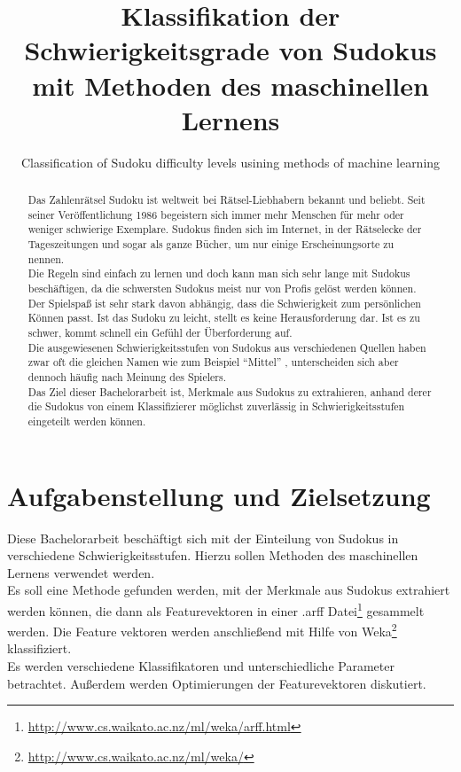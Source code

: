 \documentclass[accentcolor=tud6b,11pt,paper=a4]{tudreport}
\title{Klassifikation der Schwierigkeitsgrade von Sudokus mit Methoden des maschinellen Lernens}
\subtitle{Classification of Sudoku difficulty levels usining methods of machine learning}
\begin{document}
\maketitle

\begin{abstract}
Das Zahlenrätsel Sudoku ist weltweit bei Rätsel-Liebhabern bekannt und beliebt. Seit seiner Veröffentlichung 1986 begeistern sich immer mehr Menschen für mehr oder weniger schwierige Exemplare. Sudokus finden sich im Internet, in der Rätselecke der Tageszeitungen und sogar als ganze Bücher, um nur einige Erscheinungsorte zu nennen. \\
Die Regeln sind einfach zu lernen und doch kann man sich sehr lange mit Sudokus beschäftigen, da die schwersten Sudokus meist nur von Profis gelöst werden können.\\
Der Spielspaß ist sehr stark davon abhängig, dass die Schwierigkeit zum persönlichen Können passt. Ist das Sudoku zu leicht, stellt es keine Herausforderung dar. Ist es zu schwer, kommt schnell ein Gefühl der Überforderung auf. \\
Die ausgewiesenen Schwierigkeitsstufen von Sudokus aus verschiedenen Quellen haben zwar oft die gleichen Namen wie zum Beispiel 
\textquotedblleft Mittel\textquotedblright
, unterscheiden sich aber dennoch häufig nach Meinung des Spielers.\\
Das Ziel dieser Bachelorarbeit ist, Merkmale aus Sudokus zu extrahieren, anhand derer die Sudokus von einem Klassifizierer möglichst zuverlässig in Schwierigkeitsstufen eingeteilt werden können.\\
\end{abstract}

\tableofcontents

\chapter{Aufgabenstellung und Zielsetzung}
Diese Bachelorarbeit beschäftigt sich mit der Einteilung von Sudokus in verschiedene Schwierigkeitsstufen. Hierzu sollen Methoden des maschinellen Lernens verwendet werden. \\ Es soll eine Methode gefunden werden, mit der Merkmale aus Sudokus extrahiert werden können, die dann als Featurevektoren in einer .arff Datei\footnote{\url{http://www.cs.waikato.ac.nz/ml/weka/arff.html}} gesammelt werden. Die Feature vektoren werden anschließend mit Hilfe von Weka\footnote{\url{http://www.cs.waikato.ac.nz/ml/weka/}} klassifiziert.\\
Es werden verschiedene Klassifikatoren und unterschiedliche Parameter betrachtet. Außerdem werden Optimierungen der Featurevektoren diskutiert.
\end{document}
